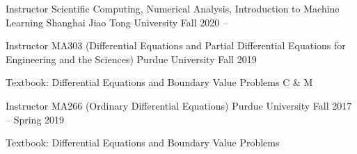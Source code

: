 
\begin{cventries}

  \cventry
  {Instructor} %
  {Scientific Computing, Numerical Analysis, Introduction to Machine Learning} %
  {Shanghai Jiao Tong University} %
  {Fall 2020 -- } %
  {
  }

  \cventry
  {Instructor} %
  {MA303 (Differential Equations and Partial Differential Equations for
  Engineering and the Sciences)} %
  {Purdue University} %
  {Fall 2019} %
  {
    \begin{cvitems} %
    \item {Textbook:  Differential Equations and Boundary Value Problems
      C \& M}
    \end{cvitems}
  }

  \cventry
  {Instructor} %
  {MA266 (Ordinary Differential Equations)} %
  {Purdue University} %
  {Fall 2017 -- Spring 2019} %
  {
    \begin{cvitems} %
    \item {Textbook: Differential Equations and Boundary Value Problems}
    \end{cvitems}
  }

\end{cventries}
